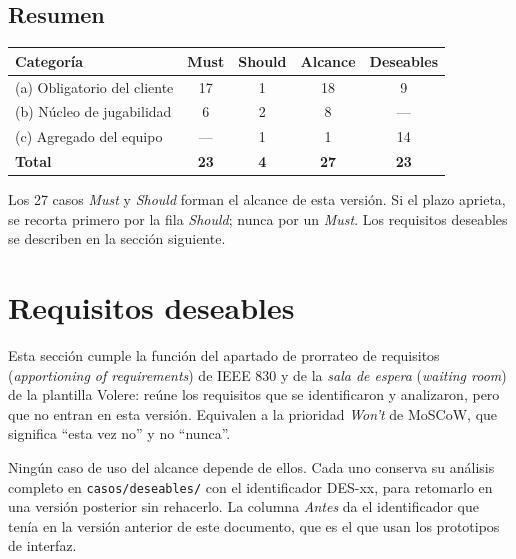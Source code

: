 \subsection*{Resumen}

\begin{center}\small
\begin{tabular}{|l|c|c|c|c|}
\hline
\textbf{Categoría} & \textbf{Must} & \textbf{Should} & \textbf{Alcance} & \textbf{Deseables} \\ \hline
(a) Obligatorio del cliente & 17 & 1 & 18 & 9 \\ \hline
(b) Núcleo de jugabilidad & 6 & 2 & 8 & --- \\ \hline
(c) Agregado del equipo & --- & 1 & 1 & 14 \\ \hline
\textbf{Total} & \textbf{23} & \textbf{4} & \textbf{27} & \textbf{23} \\ \hline
\end{tabular}
\end{center}

Los 27 casos \textit{Must} y \textit{Should} forman el alcance de esta versión. Si el plazo aprieta, se recorta primero por la fila \textit{Should}; nunca por un \textit{Must}. Los requisitos deseables se describen en la sección siguiente.

\newpage
\section*{Requisitos deseables}

Esta sección cumple la función del apartado de prorrateo de requisitos (\textit{apportioning of requirements}) de IEEE 830 y de la \textit{sala de espera} (\textit{waiting room}) de la plantilla Volere: reúne los requisitos que se identificaron y analizaron, pero que no entran en esta versión. Equivalen a la prioridad \textit{Won't} de MoSCoW, que significa ``esta vez no'' y no ``nunca''.

Ningún caso de uso del alcance depende de ellos. Cada uno conserva su análisis completo en \texttt{casos/deseables/} con el identificador \mbox{DES-xx}, para retomarlo en una versión posterior sin rehacerlo. La columna \textit{Antes} da el identificador que tenía en la versión anterior de este documento, que es el que usan los prototipos de interfaz.

